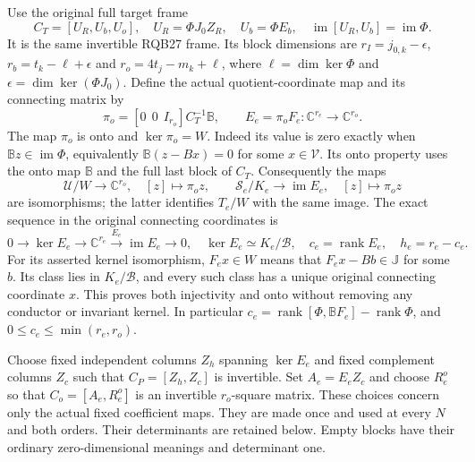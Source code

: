 \documentclass[11pt,a4paper]{article}
\begin{document}
Use the original full target frame
\[
 C_T=[U_R,U_b,U_o],\quad U_R=\Phi J_0Z_R,\quad U_b=\Phi E_b,
 \quad \operatorname{im}[U_R,U_b]=\operatorname{im}\Phi.
 \tag{CPQ3}
\]
It is the same invertible RQB27 frame. Its block dimensions are
$r_I=j_{0,k}-\epsilon$, $r_b=t_k-\ell+\epsilon$ and
$r_o=4t_j-m_k+\ell$, where $\ell=\dim\ker\Phi$ and
$\epsilon=\dim\ker(\Phi J_0)$. Define the actual quotient-coordinate
map and its connecting matrix by
\[
 \pi_o=[0\ \ 0\ \ I_{r_o}]C_T^{-1}\mathbb B,
 \qquad E_e=\pi_oF_e:\mathbb C^{r_e}\longrightarrow\mathbb C^{r_o}.
 \tag{CPQ4}
\]
The map $\pi_o$ is onto and $\ker\pi_o=W$. Indeed its value is zero
exactly when $\mathbb Bz\in\operatorname{im}\Phi$, equivalently
$\mathbb B(z-Bx)=0$ for some $x\in\mathcal V$. Its onto property
uses the onto map $\mathbb B$ and the full last block of $C_T$.
Consequently the maps
\[
 \mathcal U/W\longrightarrow\mathbb C^{r_o},\quad[z]\mapsto\pi_oz,
 \qquad
 \mathscr S_e/K_e\longrightarrow\operatorname{im}E_e,\quad
 [z]\mapsto\pi_oz
 \tag{CPQ5}
\]
are isomorphisms; the latter identifies $T_e/W$ with the same image.
The exact sequence in the original connecting coordinates is
\[
 0\longrightarrow\ker E_e\longrightarrow\mathbb C^{r_e}
                 \xrightarrow{E_e}\operatorname{im}E_e\longrightarrow0,
 \quad \ker E_e\simeq K_e/\mathscr B,\quad
 c_e=\operatorname{rank}E_e,
 \quad h_e=r_e-c_e.
 \tag{CPQ6}
\]
For its asserted kernel isomorphism, $F_ex\in W$ means that
$F_ex-Bb\in\mathbb J$ for some $b$. Its class lies in
$K_e/\mathscr B$, and every such class has a unique original
connecting coordinate $x$. This proves both injectivity and onto
without removing any conductor or invariant kernel. In particular
$c_e=\operatorname{rank}[\Phi,\mathbb BF_e]-\operatorname{rank}\Phi$,
and $0\le c_e\le\min(r_e,r_o)$.

Choose fixed independent columns $Z_h$ spanning $\ker E_e$ and
fixed complement columns $Z_c$ such that
$C_P=[Z_h,Z_c]$ is invertible. Set $A_e=E_eZ_c$ and choose $R_e^o$
so that $C_o=[A_e,R_e^o]$ is an invertible $r_o$-square matrix.
These choices concern only the actual fixed coefficient maps.
They are made once and used at every $N$ and both orders. Their
determinants are retained below. Empty blocks have their ordinary
zero-dimensional meanings and determinant one.
\end{document}
